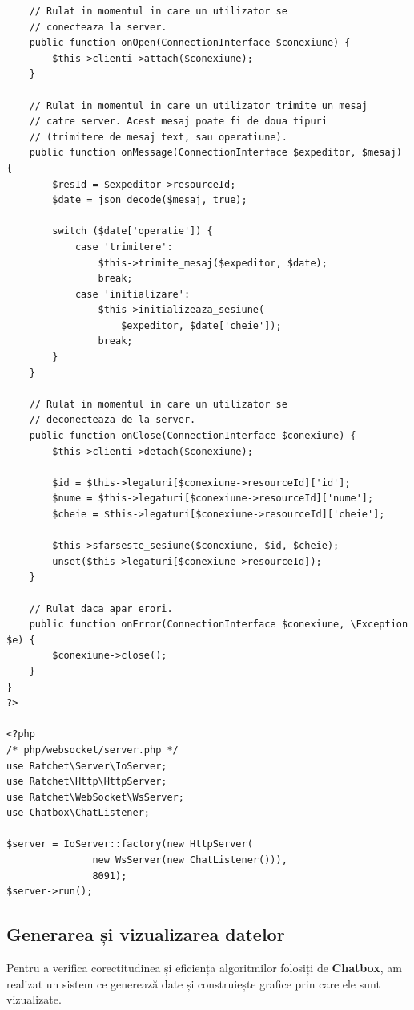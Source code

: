 \documentclass[12pt,a4paper]{article}
\begin{document}
\begin{lstlisting}
	// Rulat in momentul in care un utilizator se 
	// conecteaza la server. 
    public function onOpen(ConnectionInterface $conexiune) {
        $this->clienti->attach($conexiune);
    }

	// Rulat in momentul in care un utilizator trimite un mesaj
	// catre server. Acest mesaj poate fi de doua tipuri
	// (trimitere de mesaj text, sau operatiune). 
    public function onMessage(ConnectionInterface $expeditor, $mesaj) {
        $resId = $expeditor->resourceId;
        $date = json_decode($mesaj, true);

        switch ($date['operatie']) {
            case 'trimitere':
                $this->trimite_mesaj($expeditor, $date);
                break;
            case 'initializare':
                $this->initializeaza_sesiune(
                	$expeditor, $date['cheie']);
                break;
        }
    }

	// Rulat in momentul in care un utilizator se 
	// deconecteaza de la server. 
    public function onClose(ConnectionInterface $conexiune) {
        $this->clienti->detach($conexiune);

        $id = $this->legaturi[$conexiune->resourceId]['id'];
        $nume = $this->legaturi[$conexiune->resourceId]['nume'];
        $cheie = $this->legaturi[$conexiune->resourceId]['cheie'];

        $this->sfarseste_sesiune($conexiune, $id, $cheie);
        unset($this->legaturi[$conexiune->resourceId]);
    }

	// Rulat daca apar erori.
    public function onError(ConnectionInterface $conexiune, \Exception $e) {
        $conexiune->close();
    }
}
?>

<?php
/* php/websocket/server.php */
use Ratchet\Server\IoServer;
use Ratchet\Http\HttpServer;
use Ratchet\WebSocket\WsServer;
use Chatbox\ChatListener;

$server = IoServer::factory(new HttpServer(
               new WsServer(new ChatListener())), 
               8091);
$server->run();
\end{lstlisting}
\newpage

\subsection{Generarea și vizualizarea datelor}
Pentru a verifica corectitudinea și eficiența algoritmilor folosiți de \textbf{Chatbox}, 
am realizat un sistem ce generează date și construiește grafice prin care ele sunt vizualizate. 
\end{document}
